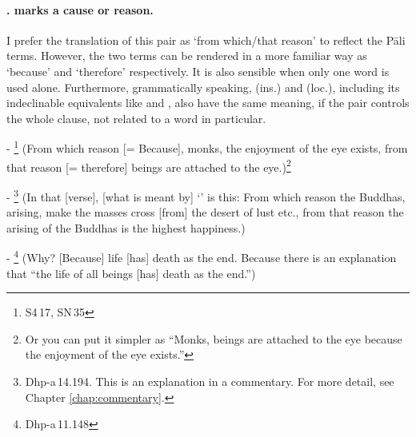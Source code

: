 \paragraph*{.  marks a cause or reason.} I prefer the translation of this pair as `from which/that reason' to reflect the P\=ali terms. However, the two terms can be rendered in a more familiar way as `because' and `therefore' respectively. It is also sensible when only one word is used alone. Furthermore, grammatically speaking,  (ins.) and  (loc.), including its indeclinable equivalents like  and , also have the same meaning, if the pair controls the whole clause, not related to a word in particular.\par
- \footnote{S4\,17, SN\,35} (From which reason [= Because], monks, the enjoyment of the eye exists, from that reason [= therefore] beings are attached to the eye.)\footnote{Or you can put it simpler as ``Monks, beings are attached to the eye because the enjoyment of the eye exists.''}\par
- \footnote{Dhp-a\,14.194. This is an explanation in a commentary. For more detail, see Chapter \ref{chap:commentary}.} (In that [verse], [what is meant by] `' is this: From which reason the Buddhas, arising, make the masses cross [from] the desert of lust etc., from that reason the arising of the Buddhas is the highest happiness.)\par
- \footnote{Dhp-a\,11.148} (Why? [Because] life [has] death as the end. Because there is an explanation that ``the life of all beings [has] death as the end.'')\par


